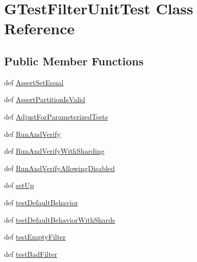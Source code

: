 \hypertarget{classgtest__filter__unittest_1_1GTestFilterUnitTest}{\section{\-G\-Test\-Filter\-Unit\-Test \-Class \-Reference}
\label{d9/df2/classgtest__filter__unittest_1_1GTestFilterUnitTest}
}
\subsection*{\-Public \-Member \-Functions}
\begin{DoxyCompactItemize}
\item 
def \hyperlink{classgtest__filter__unittest_1_1GTestFilterUnitTest_a5235ce27a6c53e2d73d0f6f26d9335b1}{\-Assert\-Set\-Equal}
\item 
def \hyperlink{classgtest__filter__unittest_1_1GTestFilterUnitTest_a89c17cb4761c12f08088a3214acdfd81}{\-Assert\-Partition\-Is\-Valid}
\item 
def \hyperlink{classgtest__filter__unittest_1_1GTestFilterUnitTest_a2dc8d19f5c81f6a8d03a9bd65ea3d2cc}{\-Adjust\-For\-Parameterized\-Tests}
\item 
def \hyperlink{classgtest__filter__unittest_1_1GTestFilterUnitTest_adc02f4ab231c886fc73ece7b7ee533c1}{\-Run\-And\-Verify}
\item 
def \hyperlink{classgtest__filter__unittest_1_1GTestFilterUnitTest_ada7337544a6bd7e4e1658afdd8e7ee81}{\-Run\-And\-Verify\-With\-Sharding}
\item 
def \hyperlink{classgtest__filter__unittest_1_1GTestFilterUnitTest_a27cd49468ecd99dff9093ea74030a299}{\-Run\-And\-Verify\-Allowing\-Disabled}
\item 
def \hyperlink{classgtest__filter__unittest_1_1GTestFilterUnitTest_ac47956db61147fc100027de51240dcd7}{set\-Up}
\item 
def \hyperlink{classgtest__filter__unittest_1_1GTestFilterUnitTest_a9da84d75ab4797f2c3730d5974ed3823}{test\-Default\-Behavior}
\item 
def \hyperlink{classgtest__filter__unittest_1_1GTestFilterUnitTest_a76485dd5b8a54abd72dc765ef491cae1}{test\-Default\-Behavior\-With\-Shards}
\item 
def \hyperlink{classgtest__filter__unittest_1_1GTestFilterUnitTest_aaf0b496c03f2f282f135e907d8c94bf3}{test\-Empty\-Filter}
\item 
def \hyperlink{classgtest__filter__unittest_1_1GTestFilterUnitTest_aa1a795f4b6fcb3373b7c050c740f5d7a}{test\-Bad\-Filter}

\end{DoxyCompactItemize}
